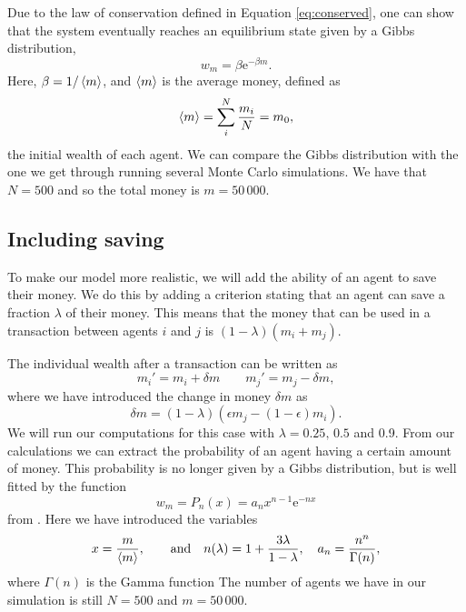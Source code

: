 \documentclass[a4paper,10pt,english]{article}
\begin{document}
Due to the law of conservation defined in Equation \ref{eq:conserved}, one can show that the system eventually reaches an equilibrium state given by a Gibbs distribution,
\begin{equation}
w_m = \beta \text{e}^{-\beta m}.
\end{equation}
Here, $\beta = 1/\ev{m}$, and $\ev{m}$ is the average money, defined as
\begin{equation}
\ev{m} = \sum_i^N \frac{m_i}{N} = m_0,
\end{equation}
the initial wealth of each agent. We can compare the Gibbs distribution with the one we get through running several Monte Carlo simulations. We have that $N=500$ and so the total money is $m=50\,000$.

\subsection{Including saving}
To make our model more realistic, we will add the ability of an agent to save their money. We do this by adding a criterion stating that an agent can save a fraction $\lambda$ of their money. This means that the money that can be used in a transaction between agents $i$ and $j$ is $(1-\lambda)(m_i+m_j)$.

The individual wealth after a transaction can be written as
\begin{equation}\label{eq:wealth}
m_i' = m_i + \delta m \qquad m_j' = m_j - \delta m,
\end{equation}
where we have introduced the change in money $\delta m$ as
\begin{equation}\label{eq:deltam}
\delta m = (1-\lambda)(\epsilon m_j -(1-\epsilon)m_i).
\end{equation} 
We will run our computations for this case with $\lambda=0.25,\,0.5$ and 0.9.
From our calculations we can extract the probability of an agent having a certain amount of money. This probability is no longer given by a Gibbs distribution, but is well fitted by the function
\begin{equation}
w_m=P_n(x)=a_nx^{n-1}\text{e}^{-nx}
\end{equation}
from \citet{Patriarca}.
Here we have introduced the variables
\begin{equation}
x=\frac{m}{\ev{m}},\qquad \text{and}\quad n(\lambda) = 1 + \frac{3\lambda}{1-\lambda}, \quad a_n=\frac{n^n}{\Gamma(n)},
\end{equation}
where $\Gamma(n)$ is the Gamma function
 The number of agents we have in our simulation is still $N=500$ and $m=50\,000$.
\end{document}
